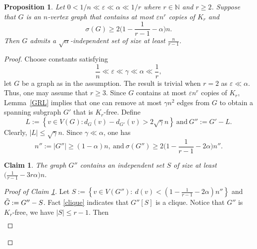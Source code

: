 \documentclass[11pt, a4paper]{article}
\newtheorem{claim}[theorem]{Claim}
\newtheorem{proposition}[theorem]{Proposition}
\theoremstyle{definition}
\newcommand{\eps}{\varepsilon}
\newcommand{\<}{\subseteq}
\begin{document}
\begin{proposition}\label{SuperT}
    Let $0< {1}/{n} \ll \eps \ll \alpha \ll {1}/{r}$ where $r\in \mathbb{N}$ and $r\ge 2$. Suppose that $G$ is an $n$-vertex graph that contains at most $\eps n^r$ copies of $K_r$ and 
$$\sigma(G)\ge 2\Big(1-\frac{1}{r-1}-\alpha\Big)n.$$
Then $G$ admits a $\sqrt{\alpha}$-independent set of size at least $\frac{n}{r-1}$.
\end{proposition}

\begin{proof}
    Choose constants satisfying 
    $$\frac{1}{n} \ll \eps\ll \gamma \ll \alpha \ll \frac{1}{r},
    $$
    let $G$ be a graph as in the assumption. The result is trivial when $r=2$ as $\eps\ll \alpha$. Thus, one may assume that $r\ge 3$. %
    Since $G$ contains at most $\eps n^r$ copies of $K_r$, Lemma~\ref{GRL} implies that one can remove at most $\gamma n^2$ edges from $G$ to obtain a spanning subgraph $G'$ that is $K_r$-free. 
    Define
    $$
    L:=\left\{v\in V(G):d_G(v)-d_{G'}(v)>2\sqrt{\gamma}n\right\}\ \text{and}\ G'':=G'-L.
    $$
    Clearly, $|L|\leq \sqrt{\gamma}n$. 
    Since $\gamma\ll \alpha$, %
    one has 
    $$
    n'':=|G''|\ge (1-\alpha)n,\ \text{and}\ \sigma(G'')\ge 2\Big(1-\frac{1}{r-1}-2\alpha\Big)n''.
    $$ %
    \begin{claim}\label{Independentset}
        The graph $G''$ contains an independent set $S$ of size at least 
$\big(\frac{1}{r-1}-3r \alpha\big)n.$
    \end{claim}
    \begin{proof}[Proof of Claim \ref{Independentset}]
        Let $S:=\left\{v\in V(G''):~d(v)< (1-\frac{1}{r-1}-2\alpha)n''\right\}$ and $\Tilde{G}:= G''-S$. Fact \ref{clique} indicates that $G''[S]$ is a clique. Notice that $G''$ is $K_r$-free, we have $|S|\le r-1$.  Then 
\begin{align}\label{MinKfree}

\end{align}
\end{proof}
\end{proof}
\end{document}
